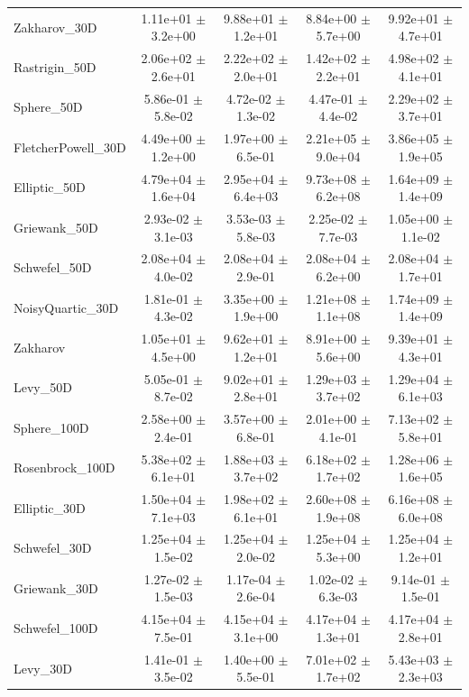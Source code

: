 \begin{table}[h]
\begin{tabular}{lcccc}
Zakharov_30D & 1.11e+01 $\pm$ 3.2e+00 & 9.88e+01 $\pm$ 1.2e+01 & 8.84e+00 $\pm$ 5.7e+00 & 9.92e+01 $\pm$ 4.7e+01 \\
Rastrigin_50D & 2.06e+02 $\pm$ 2.6e+01 & 2.22e+02 $\pm$ 2.0e+01 & 1.42e+02 $\pm$ 2.2e+01 & 4.98e+02 $\pm$ 4.1e+01 \\
Sphere_50D & 5.86e-01 $\pm$ 5.8e-02 & 4.72e-02 $\pm$ 1.3e-02 & 4.47e-01 $\pm$ 4.4e-02 & 2.29e+02 $\pm$ 3.7e+01 \\
FletcherPowell_30D & 4.49e+00 $\pm$ 1.2e+00 & 1.97e+00 $\pm$ 6.5e-01 & 2.21e+05 $\pm$ 9.0e+04 & 3.86e+05 $\pm$ 1.9e+05 \\
Elliptic_50D & 4.79e+04 $\pm$ 1.6e+04 & 2.95e+04 $\pm$ 6.4e+03 & 9.73e+08 $\pm$ 6.2e+08 & 1.64e+09 $\pm$ 1.4e+09 \\
Griewank_50D & 2.93e-02 $\pm$ 3.1e-03 & 3.53e-03 $\pm$ 5.8e-03 & 2.25e-02 $\pm$ 7.7e-03 & 1.05e+00 $\pm$ 1.1e-02 \\
Schwefel_50D & 2.08e+04 $\pm$ 4.0e-02 & 2.08e+04 $\pm$ 2.9e-01 & 2.08e+04 $\pm$ 6.2e+00 & 2.08e+04 $\pm$ 1.7e+01 \\
NoisyQuartic_30D & 1.81e-01 $\pm$ 4.3e-02 & 3.35e+00 $\pm$ 1.9e+00 & 1.21e+08 $\pm$ 1.1e+08 & 1.74e+09 $\pm$ 1.4e+09 \\
Zakharov & 1.05e+01 $\pm$ 4.5e+00 & 9.62e+01 $\pm$ 1.2e+01 & 8.91e+00 $\pm$ 5.6e+00 & 9.39e+01 $\pm$ 4.3e+01 \\
Levy_50D & 5.05e-01 $\pm$ 8.7e-02 & 9.02e+01 $\pm$ 2.8e+01 & 1.29e+03 $\pm$ 3.7e+02 & 1.29e+04 $\pm$ 6.1e+03 \\
Sphere_100D & 2.58e+00 $\pm$ 2.4e-01 & 3.57e+00 $\pm$ 6.8e-01 & 2.01e+00 $\pm$ 4.1e-01 & 7.13e+02 $\pm$ 5.8e+01 \\
Rosenbrock_100D & 5.38e+02 $\pm$ 6.1e+01 & 1.88e+03 $\pm$ 3.7e+02 & 6.18e+02 $\pm$ 1.7e+02 & 1.28e+06 $\pm$ 1.6e+05 \\
Elliptic_30D & 1.50e+04 $\pm$ 7.1e+03 & 1.98e+02 $\pm$ 6.1e+01 & 2.60e+08 $\pm$ 1.9e+08 & 6.16e+08 $\pm$ 6.0e+08 \\
Schwefel_30D & 1.25e+04 $\pm$ 1.5e-02 & 1.25e+04 $\pm$ 2.0e-02 & 1.25e+04 $\pm$ 5.3e+00 & 1.25e+04 $\pm$ 1.2e+01 \\
Griewank_30D & 1.27e-02 $\pm$ 1.5e-03 & 1.17e-04 $\pm$ 2.6e-04 & 1.02e-02 $\pm$ 6.3e-03 & 9.14e-01 $\pm$ 1.5e-01 \\
Schwefel_100D & 4.15e+04 $\pm$ 7.5e-01 & 4.15e+04 $\pm$ 3.1e+00 & 4.17e+04 $\pm$ 1.3e+01 & 4.17e+04 $\pm$ 2.8e+01 \\
Levy_30D & 1.41e-01 $\pm$ 3.5e-02 & 1.40e+00 $\pm$ 5.5e-01 & 7.01e+02 $\pm$ 1.7e+02 & 5.43e+03 $\pm$ 2.3e+03 \\

\end{tabular}
\end{table}
